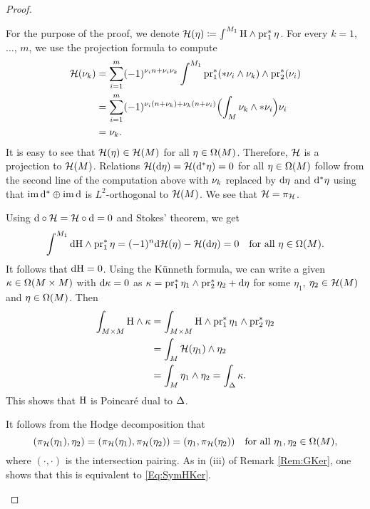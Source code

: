 \documentclass[\MainFolder/Text.tex]{subfiles}
\begin{document}
\begin{proof} %
\begin{ProofList}
\item For the purpose of the proof, we denote $\mathcal{H}(\eta) \coloneqq \int^{M_1} \mathrm{H} \wedge \operatorname{\mathrm{pr}}_1^* \eta$.
For every $k=1$,~$\dotsc$, $m$, we use the projection formula to compute
%
\allowdisplaybreaks
\begin{align*}
\mathcal{H}(\nu_k) &= \sum_{i=1}^m (-1)^{\nu_i n+\nu_i \nu_k}\int^{M_1} \operatorname{\mathrm{pr}}_1^*(* \nu_i \wedge \nu_k)\wedge \operatorname{\mathrm{pr}}_2^*(\nu_i) \\ &=\sum_{i=1}^m (-1)^{\nu_i(n+\nu_k) + \nu_k(n+\nu_i)}\Bigl(\int_M \nu_k \wedge * \nu_i\Bigr) \nu_i \\
 & = \nu_k.
\end{align*}
It is easy to see that $\mathcal{H}(\eta) \in \mathcal{H}(M)$ for all $\eta\in \Omega(M)$.
Therefore, $\mathcal{H}$ is a projection to $\mathcal{H}(M)$.
Relations $\mathcal{H}(\mathrm{d} \eta) = \mathcal{H}(\mathrm{d}^* \eta) = 0$ for all $\eta\in \Omega(M)$ follow from the second line of the computation above with $\nu_k$ replaced by $\mathrm{d}\eta$ and $\mathrm{d}^*\eta$ using that $\operatorname{im} \mathrm{d}^* \oplus \operatorname{im} \mathrm{d}$ is $L^2$-orthogonal to $\mathcal{H}(M)$.
We see that $\mathcal{H} = \pi_{\mathcal{H}}$. 

\item Using $\mathrm{d} \circ \mathcal{H} = \mathcal{H} \circ \mathrm{d} = 0$ and Stokes' theorem, we get 
\[  \int^{M_1} \mathrm{d} \mathrm{H} \wedge \operatorname{\mathrm{pr}}_1^* \eta = (-1)^n \mathrm{d} \mathcal{H}(\eta) - \mathcal{H}(\mathrm{d} \eta) = 0\quad \text{for all }\eta\in \Omega(M). \]
It follows that $\mathrm{d} \mathrm{H} = 0$.
Using the K\"unneth formula, we can write a given $\kappa\in \Omega(M\times M)$ with $\mathrm{d} \kappa = 0$ as $\kappa = \operatorname{\mathrm{pr}}_1^* \eta_1 \wedge \operatorname{\mathrm{pr}}_2^* \eta_2 + \mathrm{d} \eta$ for some $\eta_1$, $\eta_2 \in \mathcal{H}(M)$ and $\eta\in \Omega(M)$.
Then 
\[ \begin{aligned} \int_{M\times M} \mathrm{H} \wedge \kappa & = \int_{M\times M} \mathrm{H} \wedge \operatorname{\mathrm{pr}}_1^* \eta_1 \wedge \operatorname{\mathrm{pr}}_2^* \eta_2 \\ &= \int_M \mathcal{H}(\eta_1)\wedge \eta_2 \\ &= \int_M \eta_1 \wedge \eta_2 = \int_{\Delta} \kappa. \end{aligned} \]
This shows that $\mathrm{H}$ is Poincar\'e dual to $\Delta$.
\item It follows from the Hodge decomposition that
\begin{equation}\label{Eq:HKerHKer}
(\pi_{\mathcal{H}}(\eta_1), \eta_2) = (\pi_{\mathcal{H}}(\eta_1), \pi_{\mathcal{H}}(\eta_2)) = (\eta_1,\pi_{\mathcal{H}}(\eta_2))\quad\text{for all }\eta_1, \eta_2 \in \Omega(M),
\end{equation}
where $(\cdot,\cdot)$ is the intersection pairing.
As in (iii) of Remark \ref{Rem:GKer}, one shows that this is equivalent to \eqref{Eq:SymHKer}.\qedhere
\end{ProofList}
\end{proof}
\end{document}
